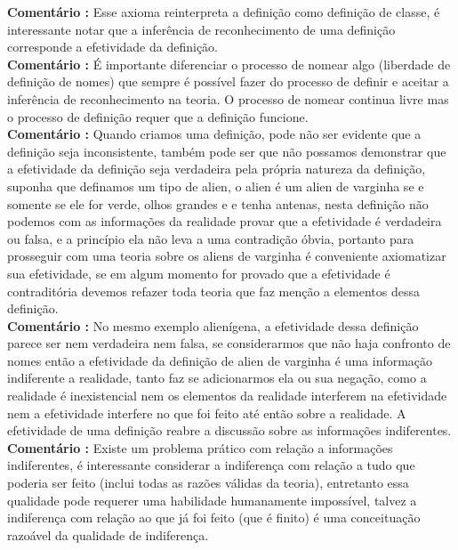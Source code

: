 \documentclass[10pt,a4paper]{report}
\begin{document}
\textbf{Comentário :} Esse axioma reinterpreta a definição como definição de classe, é interessante notar que a inferência de reconhecimento de uma definição corresponde a efetividade da definição.\\

\textbf{Comentário :} É importante diferenciar o processo de nomear algo (liberdade de definição de nomes) que sempre é possível fazer do processo de definir e aceitar a inferência de reconhecimento na teoria. O processo de nomear continua livre mas o processo de definição requer que a definição funcione.\\

\textbf{Comentário :} Quando criamos uma definição, pode não ser evidente que a definição seja inconsistente, também pode ser que não possamos demonstrar que a efetividade da definição seja verdadeira pela própria natureza da definição, suponha que definamos um tipo de alien, o alien é um alien de varginha se e somente se ele for verde, olhos grandes e e tenha antenas, nesta definição não podemos com as informações da realidade provar que a efetividade é verdadeira ou falsa, e a princípio ela não leva a uma contradição óbvia, portanto para prosseguir com uma teoria sobre os aliens de varginha é conveniente axiomatizar sua efetividade, se em algum momento for provado que a efetividade é contraditória devemos refazer toda teoria que faz menção a elementos dessa definição.\\

\textbf{Comentário :} No mesmo exemplo alienígena, a efetividade dessa definição parece ser nem verdadeira nem falsa, se considerarmos que não haja confronto de nomes então a efetividade da definição de alien de varginha é uma informação indiferente a realidade, tanto faz se adicionarmos ela ou sua negação, como a realidade é inexistencial nem os elementos da realidade interferem na efetividade nem a efetividade interfere no que foi feito até então sobre a realidade. A efetividade de uma definição reabre a discussão sobre as informações indiferentes. \\

\textbf{Comentário :} Existe um problema prático com relação a informações indiferentes, é interessante considerar a indiferença com relação a tudo que poderia ser feito (inclui todas as razões válidas da teoria), entretanto essa qualidade pode requerer uma habilidade humanamente impossível, talvez a indiferença com relação ao que já foi feito (que é finito) é uma conceituação razoável da qualidade de indiferença.\\
\end{document}
